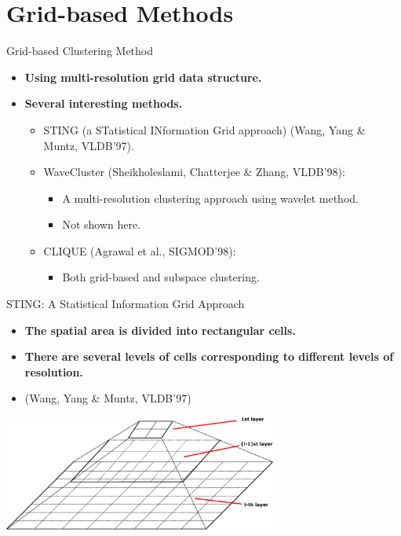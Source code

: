 \section{Grid-based Methods}

\begin{frame}{Grid-based Clustering Method}
	\begin{itemize}
		\item \textbf{Using multi-resolution grid data structure.}
		\item \textbf{Several interesting methods.}
		\begin{itemize}
			\item STING (a STatistical INformation Grid approach) (Wang, Yang 
			\& Muntz, VLDB'97).
			\item WaveCluster (Sheikholeslami, Chatterjee \& Zhang, VLDB'98):
			\begin{itemize}
				\item A multi-resolution clustering approach using wavelet 
				method.
				\item Not shown here.
			\end{itemize}
			\item CLIQUE (Agrawal et al., SIGMOD'98):
			\begin{itemize}
				\item Both grid-based and subspace clustering.
			\end{itemize}
		\end{itemize}
	\end{itemize}
\end{frame}

\begin{frame}{STING: A Statistical Information Grid Approach}
	\begin{itemize}
		\item \textbf{The spatial area is divided into rectangular cells.}
		\item \textbf{There are several levels of cells corresponding to 
		different levels of resolution.}
		\item (Wang, Yang \& Muntz, VLDB'97)
	\end{itemize}
	\vspace{0.5cm}
	\centering
	\includegraphics[width=9cm]{img/layers.pdf}
\end{frame}

